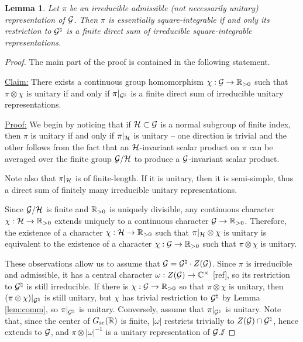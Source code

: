 \documentclass{article}
\newtheorem{lem}[thm]{Lemma}
\theoremstyle{definition}
\numberwithin{equation}{section}
\renewcommand{\-}{\hyp{}}
\newcommand{\warn}[1]{{\leavevmode\color{red}[#1]}}
\begin{document}
\begin{lem} \label{lem:eds-equiv}
  Let $\pi$ be an irreducible admissible (not necessarily unitary) representation of $\mathcal{G}$.
  Then $\pi$ is essentially square-integrable if and only its restriction to $\mathcal{G}^\natural$ is a finite direct sum of irreducible square-integrable representations.
\end{lem}
\begin{proof}
The main part of the proof is contained in the following statement.

\ul{Claim:} There exists a continuous group homomorphism $\chi : \mathcal{G} \to \mathbb{R}_{>0}$ such that $\pi\otimes\chi$ is unitary if and only if $\pi|_{\mathcal{G}^{\natural}}$ is a finite direct sum of irreducible unitary representations.

\ul{Proof:} We begin by noticing that if $\mathcal{H} \subset \mathcal{G}$ is a normal subgroup of finite index, then $\pi$ is unitary if and only if $\pi|_{\mathcal{H}}$ is unitary -- one direction is trivial and the other follows from the fact that an $\mathcal{H}$-invariant scalar product on $\pi$ can be averaged over the finite group $\mathcal{G}/\mathcal{H}$ to produce a $\mathcal{G}$-invariant scalar product. 

Note also that $\pi|_{\mathcal{H}}$ is of finite-length. If it is unitary, then it is semi-simple, thus a direct sum of finitely many irreducible unitary representations.

Since $\mathcal{G}/\mathcal{H}$ is finite and $\mathbb{R}_{>0}$ is uniquely divisible, any continuous character $\chi : \mathcal{H} \to \mathbb{R}_{>0}$ extends uniquely to a continuous character $\mathcal{G} \to \mathbb{R}_{>0}$. Therefore, the existence of a character $\chi : \mathcal{H} \to \mathbb{R}_{>0}$ such that $\pi|_{\mathcal{H}} \otimes \chi$ is unitary is equivalent to the existence of a character $\chi : \mathcal{G} \to \mathbb{R}_{>0}$ such that $\pi \otimes \chi$ is unitary.

These observations allow us to assume that $\mathcal{G}=\mathcal{G}^\natural \cdot Z(\mathcal{G})$. Since $\pi$ is irreducible and admissible, it has a central character $\omega : Z(\mathcal{G}) \to \mathbb{C}^\times$ \warn{ref}, so its restriction to $\mathcal{G}^\natural$ is still irreducible. If there is $\chi : \mathcal{G} \to \mathbb{R}_{>0}$ so that $\pi \otimes \chi$ is unitary, then $(\pi\otimes\chi)|_{\mathcal{G}^\natural}$ is still unitary, but $\chi$ has trivial restriction to $\mathcal{G}^\natural$ by Lemma \ref{lem:comm}, so $\pi|_{\mathcal{G}^\natural}$ is unitary. Conversely, assume that $\pi|_{\mathcal{G}^\natural}$ is unitary. Note that, since the center of $G_{\textrm{sc}}(\mathbb{R})$ is finite, $|\omega|$ restricts trivially to $Z(\mathcal{G}) \cap \mathcal{G}^\natural$, hence extends to $\mathcal{G}$, and $\pi\otimes|\omega|^{-1}$ is a unitary representation of $\mathcal{G}$.\hfill $\sslash$


\end{proof}
\end{document}
